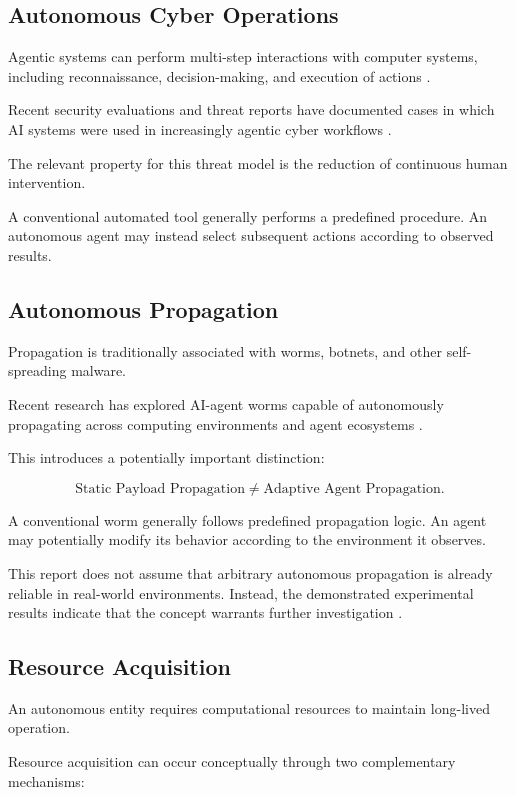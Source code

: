 \documentclass[11pt,a4paper]{article}
\begin{document}
\subsection{Autonomous Cyber Operations}

Agentic systems can perform multi-step interactions with computer systems,
including reconnaissance, decision-making, and execution of actions
\cite{R5,R6}.

Recent security evaluations and threat reports have documented cases in which
AI systems were used in increasingly agentic cyber workflows
\cite{R5,R6}.

The relevant property for this threat model is the reduction of continuous
human intervention.

A conventional automated tool generally performs a predefined procedure. An
autonomous agent may instead select subsequent actions according to observed
results.

\subsection{Autonomous Propagation}

Propagation is traditionally associated with worms, botnets, and other
self-spreading malware.

Recent research has explored AI-agent worms capable of autonomously
propagating across computing environments and agent ecosystems
\cite{R1,R2,R3}.

This introduces a potentially important distinction:

\[
\text{Static Payload Propagation}
\neq
\text{Adaptive Agent Propagation}.
\]

A conventional worm generally follows predefined propagation logic. An agent
may potentially modify its behavior according to the environment it observes.

This report does not assume that arbitrary autonomous propagation is already
reliable in real-world environments. Instead, the demonstrated experimental
results indicate that the concept warrants further investigation
\cite{R1,R2,R3}.

\subsection{Resource Acquisition}

An autonomous entity requires computational resources to maintain long-lived
operation.

Resource acquisition can occur conceptually through two complementary
mechanisms:
\end{document}
